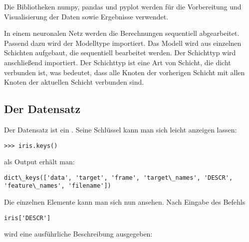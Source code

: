 Die Bibliotheken numpy, pandas und pyplot werden für die Vorbereitung und Visualisierung der Daten sowie Ergebnisse verwendet.

In einem neuronalen Netz werden die Berechnungen sequentiell abgearbeitet. Passend dazu
wird der Modelltype  importiert. Das Modell wird aus einzelnen
Schichten aufgebaut, die sequentiell bearbeitet werden. Der Schichttyp 
wird anschließend importiert. Der Schichttyp  ist eine Art von Schicht, die \glqq dicht\grqq{} 
verbunden ist, was bedeutet, dass alle Knoten der vorherigen Schicht mit allen Knoten der 
aktuellen Schicht verbunden sind.

\subsection{Der Datensatz}
Der Datensatz ist ein . Seine Schlüssel
kann man sich leicht anzeigen lassen:

\begin{verbatim}
>>> iris.keys()
\end{verbatim}


als Output erhält man:

\begin{lstlisting}[numbers=none]
dict\_keys(['data', 'target', 'frame', 'target\_names', 'DESCR', 'feature\_names', 'filename'])
\end{lstlisting}
\medskip

Die einzelnen Elemente kann man sich nun ansehen.
Nach Eingabe des Befehls 
\begin{verbatim}
iris['DESCR']
\end{verbatim}
wird eine ausführliche Beschreibung ausgegeben:


